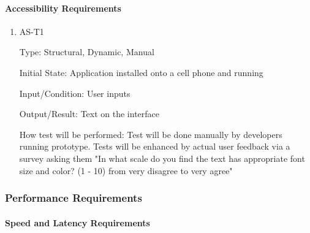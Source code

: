 \documentclass[12pt, titlepage]{article}
\begin{document}
\paragraph{Accessibility Requirements}

\begin{enumerate}

\item{AS-T1\\}

Type: Structural, Dynamic, Manual
					
Initial State: Application installed onto a cell phone and running
					
Input/Condition: User inputs
					
Output/Result: Text on the interface
					
How test will be performed: Test will be done manually by developers running prototype. Tests will be enhanced by actual user feedback via a survey asking them "In what scale do you find the text has appropriate font size and color? (1 - 10) from very disagree to very agree"

\end{enumerate}

\subsubsection{Performance Requirements}
		
\paragraph{Speed and Latency Requirements}
\end{document}
